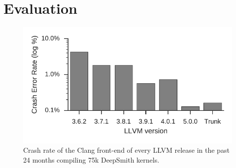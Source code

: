 \section{Evaluation}%
\label{sec:eval}

\begin{figure}
	\centering %
	\includegraphics[width=.85\columnwidth]{img/clang-crashes}%
	\vspace{-2em}
	\caption{%
		Crash rate of the Clang front-end of every LLVM release in the past 24
		months compiling 75k DeepSmith kernels.%
	}%
	\vspace{-1em}
	\label{fig:clangs}
\end{figure}

\begin{table}
	\footnotesize %
	\centering %
	\caption{%
		The number of DeepSmith programs which trigger distinct Clang front-end
		assertions, and the number of programs which trigger unreachables.%
	}
	\vspace{-1.5em}
	
	\label{tab:clangs}
\end{table}



